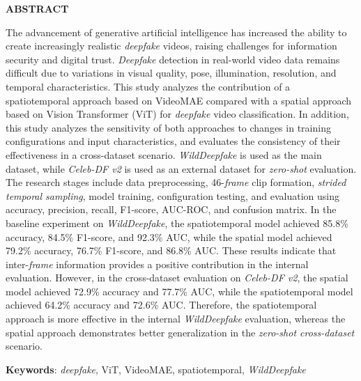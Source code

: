\clearpage
{}%
\thispagestyle{fancy}

\begin{center}
	\large \bfseries \MakeUppercase{Abstract}\\
	\bigskip
	
	\normalsize \normalfont \justifying \singlespacing
	The advancement of generative artificial intelligence has increased the ability to create increasingly realistic \textit{deepfake} videos, raising challenges for information security and digital trust. \textit{Deepfake} detection in real-world video data remains difficult due to variations in visual quality, pose, illumination, resolution, and temporal characteristics. This study analyzes the contribution of a spatiotemporal approach based on VideoMAE compared with a spatial approach based on Vision Transformer (ViT) for \textit{deepfake} video classification. In addition, this study analyzes the sensitivity of both approaches to changes in training configurations and input characteristics, and evaluates the consistency of their effectiveness in a cross-dataset scenario. \textit{WildDeepfake} is used as the main dataset, while \textit{Celeb-DF v2} is used as an external dataset for \textit{zero-shot} evaluation. The research stages include data preprocessing, 46-\textit{frame} clip formation, \textit{strided temporal sampling}, model training, configuration testing, and evaluation using accuracy, precision, recall, F1-score, AUC-ROC, and confusion matrix. In the baseline experiment on \textit{WildDeepfake}, the spatiotemporal model achieved 85.8\% accuracy, 84.5\% F1-score, and 92.3\% AUC, while the spatial model achieved 79.2\% accuracy, 76.7\% F1-score, and 86.8\% AUC. These results indicate that inter-\textit{frame} information provides a positive contribution in the internal evaluation. However, in the cross-dataset evaluation on \textit{Celeb-DF v2}, the spatial model achieved 72.9\% accuracy and 77.7\% AUC, while the spatiotemporal model achieved 64.2\% accuracy and 72.6\% AUC. Therefore, the spatiotemporal approach is more effective in the internal \textit{WildDeepfake} evaluation, whereas the spatial approach demonstrates better generalization in the \textit{zero-shot cross-dataset} scenario.\par
    
    \vspace{20pt}
	\raggedright\textbf{Keywords}: \textit{deepfake}, ViT, VideoMAE, spatiotemporal, \textit{WildDeepfake}
	
	\vfill
	
\end{center}
\clearpage
